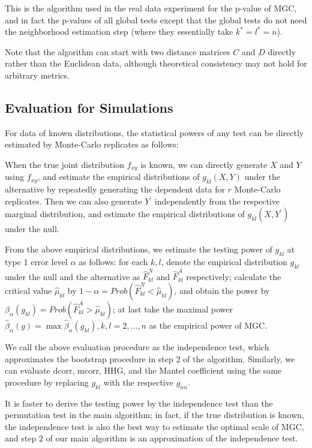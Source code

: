 \documentclass[11pt]{article}
\newcommand{\jv}[1]{{\color{red}{#1}}}
\newcommand{\cs}[1]{{\color{blue}{#1}}}
\begin{document}
This is the algorithm used in the real data experiment for the p-value of MGC, and in fact the p-values of all global tests except that the global tests do not need the neighborhood estimation step (where they essentially take $k^{*}=l^{*}=n$).

Note that the algorithm can start with two distance matrices $C$ and $D$ directly rather than the Euclidean data, although theoretical consistency may not hold for arbitrary metrics.

\subsection{Evaluation for Simulations}

For data of known distributions, the statistical powers of any test can be directly estimated by Monte-Carlo replicates as follows:

When the true joint distribution $f_{xy}$ is known, we can directly generate $X$ and $Y$ using $f_{xy}$, and estimate the empirical distributions of $g_{kl}(X,Y)$ under the alternative by repeatedly generating the dependent data for $r$ Monte-Carlo replicates. Then we can also generate $Y^{'}$ independently from the respective marginal distribution, and estimate the empirical distributions of $g_{kl}(X,Y^{'})$ under the null.

From the above empirical distributions, we estimate the testing power of $g_{kl}$ at type 1 error level $\alpha$ as follows: for each $k,l$, denote the empirical distribution $g_{kl}$ under the null and the alternative as $\hat{F}_{kl}^{N}$ and $\hat{F}_{kl}^A$ respectively; calculate the critical value $\hat{\mu}_{kl}$ by $1-\alpha=Prob(\hat{F}_{kl}^{N}<\hat{\mu}_{kl})$, and obtain the power by $\beta_{\alpha}(g_{kl})=Prob(\hat{F}_{kl}^{A}>\hat{\mu}_{kl})$; at last take the maximal power $\hat{\beta}_{\alpha}(g)=\max{\hat{\beta}_{\alpha}(g_{kl}), k,l=2, \ldots,n}$ as the empirical power of MGC.

\jv{ please clarify in the above ``how'' you get power from those two distributions. }
\cs{ is the above clear to you now? }

We call the above evaluation procedure as the independence test, which approximates the bootstrap procedure in step 2 of the algorithm. Similarly, we can evaluate dcorr, mcorr, HHG, and the Mantel coefficient using the same procedure by replacing $g_{kl}$ with the respective $g_{nn}$. 

It is faster to derive the testing power by the independence test than the permutation test in the main algorithm; in fact, if the true distribution is known, the independence test is also the best way to estimate the optimal scale of MGC, and step $2$ of our main algorithm is an approximation of the independence test. 
\end{document}

